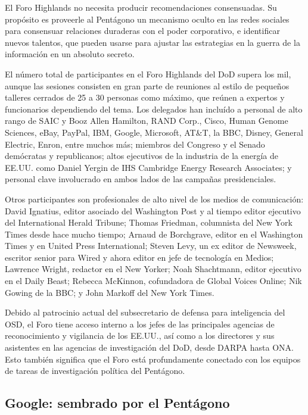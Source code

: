 \documentclass[10pt,a5paper,twoside,spanish,]{book}
\begin{document}
El Foro Highlands no necesita producir recomendaciones consensuadas. Su
propósito es proveerle al Pentágono un mecanismo oculto en las redes
sociales para consensuar relaciones duraderas con el poder corporativo,
e identificar nuevos talentos, que pueden usarse para ajustar las
estrategias en la guerra de la información en un absoluto secreto.

El número total de participantes en el Foro Highlands del DoD supera los
mil, aunque las sesiones consisten en gran parte de reuniones al estilo
de pequeños talleres cerrados de 25 a 30 personas como máximo, que
reúnen a expertos y funcionarios dependiendo del tema. Los delegados han
incluído a personal de alto rango de SAIC y Booz Allen Hamilton, RAND
Corp., Cisco, Human Genome Sciences, eBay, PayPal, IBM, Google,
Microsoft, AT\&T, la BBC, Disney, General Electric, Enron, entre muchos
más; miembros del Congreso y el Senado demócratas y republicanos; altos
ejecutivos de la industria de la energía de EE.UU. como Daniel Yergin de
IHS Cambridge Energy Research Associates; y personal clave involucrado
en ambos lados de las campañas presidenciales.

Otros participantes son profesionales de alto nivel de los medios de
comunicación: David Ignatius, editor asociado del Washington Post y al
tiempo editor ejecutivo del International Herald Tribune; Thomas
Friedman, columnista del New York Times desde hace mucho tiempo; Arnaud
de Borchgrave, editor en el Washington Times y en United Press
International; Steven Levy, un ex editor de Newsweek, escritor senior
para Wired y ahora editor en jefe de tecnología en Medios; Lawrence
Wright, redactor en el New Yorker; Noah Shachtmann, editor ejecutivo en
el Daily Beast; Rebecca McKinnon, cofundadora de Global Voices Online;
Nik Gowing de la BBC; y John Markoff del New York Times.

Debido al patrocinio actual del subsecretario de defensa para
inteligencia del OSD, el Foro tiene acceso interno a los jefes de las
principales agencias de reconocimiento y vigilancia de los EE.UU., así
como a los directores y sus asistentes en las agencias de investigación
del DoD, desde DARPA hasta ONA. Esto también significa que el Foro está
profundamente conectado con los equipos de tareas de investigación
política del Pentágono.

\subsection{Google: sembrado por el
Pentágono}\label{google-sembrado-por-el-pentuxe1gono}
\end{document}
